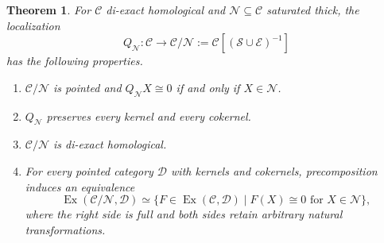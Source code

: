 \documentclass[11pt,reqno,a4paper]{amsart}
\newtheorem{theorem}{Theorem}[section]
\theoremstyle{definition}
\theoremstyle{remark}
\newcommand{\C}{\mathcal{C}}
\newcommand{\D}{\mathcal{D}}
\newcommand{\N}{\mathcal{N}}
\newcommand{\0}{\mathbf{0}}
\renewcommand{\1}{\mathbf{1}}
\newcommand{\Sden}{\mathcal S}
\newcommand{\Eden}{\mathcal E}
\DeclareMathOperator{\Ex}{Ex}
\begin{document}
\begin{theorem}\label{di:thm:quotient}
For $\C$ di-exact homological and $\N\subseteq\C$ saturated thick, the localization
\[
 Q_{\N}:\C\longrightarrow\C/\N:=\C[(\Sden\cup\Eden)^{-1}]
\]
has the following properties.
\begin{enumerate}[label=\textup{(\roman*)}]
\item $\C/\N$ is pointed and $Q_{\N}X\cong0$ if and only if $X\in\N$.
\item $Q_{\N}$ preserves every kernel and every cokernel.
\item $\C/\N$ is di-exact homological.
\item For every pointed category $\D$ with kernels and cokernels, precomposition induces an equivalence
\begin{equation}\label{di:eq:2up}
 \Ex(\C/\N,\D)\simeq
 \{F\in\Ex(\C,\D)\mid F(X)\cong0\text{ for }X\in\N\},
\end{equation}
where the right side is full and both sides retain arbitrary natural transformations.
\end{enumerate}
\end{theorem}
\end{document}
